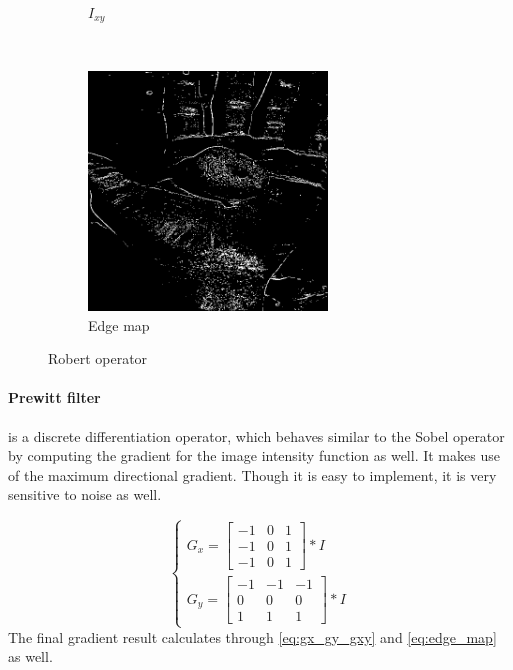 \documentclass[12pt]{article}
\begin{document}
\begin{figure}[H]
\begin{subfigure}[t]{0.5\textwidth}
        \caption{$I_{xy}$}
    \end{subfigure}%
    ~
    \begin{subfigure}[t]{0.5\textwidth}
        \centering
        \includegraphics[height=2.5in]{images/robert_edge}
        \caption{Edge map}
    \end{subfigure}
    \caption{Robert operator}
\end{figure}

\paragraph*{Prewitt filter} is a discrete differentiation operator, which behaves similar to the Sobel operator by computing the gradient for the image intensity function as well.
It makes use of the maximum directional gradient. Though it is easy to implement, it is very sensitive to noise as well.

\begin{equation}
\label{eq:robert_op}
\begin{cases}
	G_x = \begin{bmatrix}
		-1 & 0 & 1 \\ -1 & 0 & 1 \\ -1 & 0 & 1 
	\end{bmatrix} \ast I\\
	G_y = \begin{bmatrix}
		-1 & -1 & -1 \\ 0 & 0 & 0 \\ 1 & 1 & 1
	\end{bmatrix} \ast I
\end{cases}
\end{equation}
The final gradient result calculates through \autoref{eq:gx_gy_gxy} and \autoref{eq:edge_map} as well.
\end{document}
